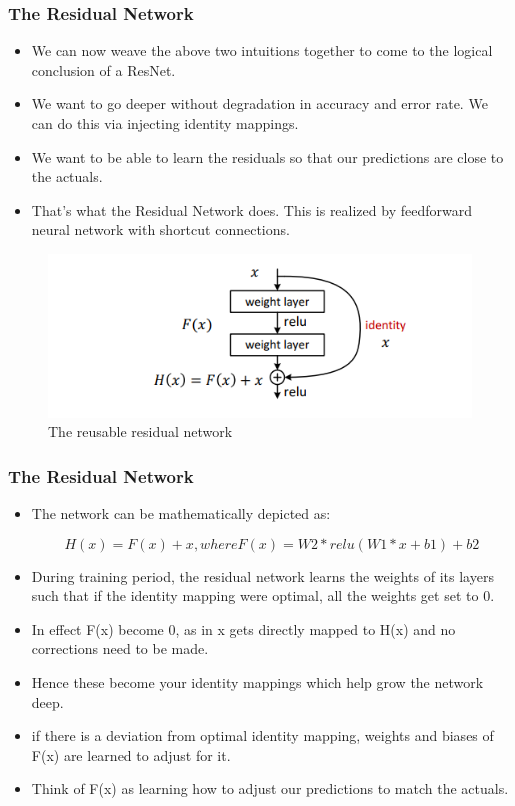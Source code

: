 \documentclass{beamer}
\begin{document}
\begin{frame}
\frametitle{The Residual Network}

\begin{itemize}
   
   \item We can now weave the above two intuitions together to come to the logical conclusion of a ResNet.
   \item We want to go deeper without degradation in accuracy and error rate. We can do this via injecting identity mappings.
    \item We want to be able to learn the residuals so that our predictions are close to the actuals.
    \item That’s what the Residual Network does. This is realized by feedforward neural network with shortcut connections.
  
  
\end{itemize}
\begin{figure}
    \centering
\includegraphics[scale=0.5]{resnet1.PNG}
    \caption{The reusable residual network}
    \label{fig:my_label}
\end{figure}

\end{frame}


\begin{frame}
\frametitle{The Residual Network}

\begin{itemize}
   
   \item The network can be mathematically depicted as:

$$H(x) = F(x) + x, where F(x) = W2*relu(W1*x+b1)+b2$$
\item During training period, the residual network learns the weights of its layers such that if the identity mapping were optimal, all the weights get set to 0.
\item In effect F(x) become 0, as in x gets directly mapped to H(x) and no corrections need to be made.
\item Hence these become your identity mappings which help grow the network deep.
\item if there is a deviation from optimal identity mapping, weights and biases of F(x) are learned to adjust for it. \item Think of F(x) as learning how to adjust our predictions to match the actuals.
  
  
\end{itemize}


\end{frame}
\end{document}

